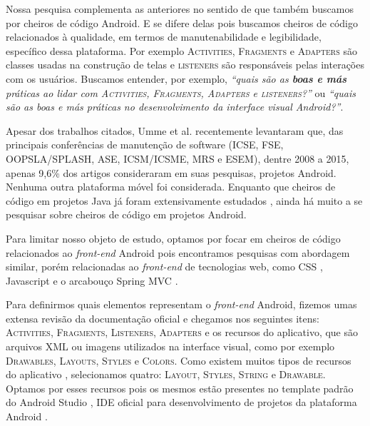 Nossa pesquisa complementa as anteriores no sentido de que também buscamos por cheiros de código Android. E se difere delas pois buscamos cheiros de código relacionados à qualidade, em termos de manutenabilidade e legibilidade, específico dessa plataforma. Por exemplo \textsc{Activities}, \textsc{Fragments} e \textsc{Adapters} são classes usadas na construção de telas e \textsc{listeners} são responsáveis pelas interações com os usuários. Buscamos entender, por exemplo, \textit{``quais são as \textbf{boas e más} práticas ao lidar com \textsc{Activities}, \textsc{Fragments}, \textsc{Adapters} e \textsc{listeners}?''} ou \textit{``quais são as \emph{boas e más} práticas no desenvolvimento da interface visual Android?''}. 

Apesar dos trabalhos citados, Umme et al. \cite{Mannan_Dig_Ahmed_Jensen_Abdullah_Almurshed} recentemente levantaram que, das principais conferências de manutenção de software (ICSE, FSE, OOPSLA/SPLASH, ASE, ICSM/ICSME, MRS e ESEM), dentre 2008 a 2015, apenas 9,6\% dos artigos consideraram em suas pesquisas, projetos Android. Nenhuma outra plataforma móvel foi considerada. Enquanto que cheiros de código em projetos Java já foram extensivamente estudados \cite{Riel, Refactoring:99, Martin:2008:CCH:1388398}, ainda há muito a se pesquisar sobre cheiros de código em projetos Android.

Para limitar nosso objeto de estudo, optamos por focar em cheiros de código relacionados ao \textit{front-end} Android pois encontramos pesquisas com abordagem similar, porém relacionadas ao \textit{front-end} de tecnologias web, como CSS \cite{CSSCodeSmell}, Javascript \cite{BB} e o arcabouço Spring MVC \cite{FinavaroAniche2016}. 


Para definirmos quais elementos representam o \textit{front-end} Android, fizemos umas extensa revisão da documentação oficial e chegamos nos seguintes itens: \textsc{Activities}, \textsc{Fragments}, \textsc{Listeners}, \textsc{Adapters} e os recursos do aplicativo, que são arquivos XML ou imagens utilizados na interface visual, como por exemplo \textsc{Drawables}, \textsc{Layouts}, \textsc{Styles} e \textsc{Colors}. Como existem muitos tipos de recursos do aplicativo \cite{AndroidResourcesOverview}, selecionamos quatro: \textsc{Layout}, \textsc{Styles}, \textsc{String} e \textsc{Drawable}. Optamos por esses recursos pois os mesmos estão presentes no template padrão do Android Studio \cite{FirstApp2017}, IDE oficial para desenvolvimento de projetos da plataforma Android \cite{AndroidStudio}. 

